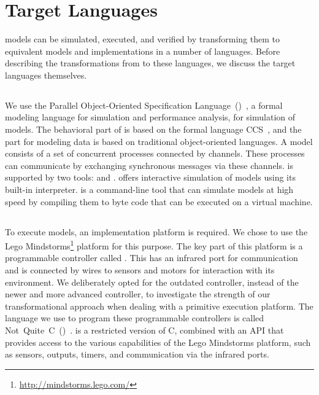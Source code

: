 \section{Target Languages}
\label{sec:slco:target-platforms}

\SLCO models can be simulated, executed, and verified by transforming them to equivalent models and implementations in a number of languages.
Before describing the transformations from \SLCO to these languages, we discuss the target languages themselves.

\subsection{\POOSL}
We use the Parallel Object-Oriented Specification Language~(\POOSL)~\cite{Theelen2007}, a formal modeling language for simulation and performance analysis, for simulation of \SLCO models.
The behavioral part of \POOSL is based on the formal language CCS~\cite{Milner1989}, and the part for modeling data is based on traditional object-oriented languages.
A \POOSL model consists of a set of concurrent processes connected by channels.
These processes can communicate by exchanging synchronous messages via these channels.
\POOSL is supported by two tools: \SHESim and \Rotalumis.
\SHESim offers interactive simulation of \POOSL models using its built-in \POOSL interpreter.
\Rotalumis is a command-line tool that can simulate \POOSL models at high speed by compiling them to byte code that can be executed on a virtual machine.

\subsection{\NQC}
To execute \SLCO models, an implementation platform is required.
We chose to use the Lego Mindstorms\footnote{\url{http://mindstorms.lego.com/}} platform for this purpose.
The key part of this platform is a programmable controller called \RCX.
This \RCX has an infrared port for communication and is connected by wires to sensors and motors for interaction with its environment.
We deliberately opted for the outdated \RCX controller, instead of the newer and more advanced \NXT controller, to investigate the strength of our transformational approach when dealing with a primitive execution platform.
The language we use to program these programmable controllers is called Not~Quite~C~(\NQC)~\cite{Baum2003}.
\NQC is a restricted version of C, combined with an API that provides access to the various capabilities of the Lego Mindstorms platform, such as sensors, outputs, timers, and communication via the infrared ports.

